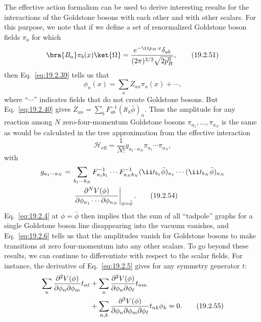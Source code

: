 The effective action formalism can be used to derive interesting results for
the interactions of the Goldstone bosons with each other and with other
scalars. For this purpose, we note that if we define a set of renormalized
Goldstone boson fields $\pi_a$ for which
\begin{equation}
 \bra{B_a}\pi_b(x)\ket{\Omega}
 =\frac{e^{-\ii p_B\cdot x}\delta_{ab}}
 {(2\pi)^{3/2}\sqrt{2p_B^0}},
 \tag{19.2.51}\label{eq:19.2.51}
\end{equation}
then Eq.~\eqref{eq:19.2.39} tells us that
\begin{equation}
 \phi_n(x)=\sum_a Z_{an}\pi_a(x)+\cdots,
 \tag{19.2.52}\label{eq:19.2.52}
\end{equation}
where ``$\cdots$'' indicates fields that do not create Goldstone bosons. But
Eq.~\eqref{eq:19.2.40} gives
$Z_{an}=\sum_bF^{-1}_{ab}(\ii t_b\bar\phi)_n$. Thus the amplitude for any
reaction among $N$ zero-four-momentum Goldstone bosons
$\pi_{a_1},\ldots,\pi_{a_N}$ is the same as would be calculated in the tree
approximation from the effective interaction
\begin{equation}
 \mathcal H_{\mathrm{eff}}
 =\frac{1}{N!}g_{a_1\cdots a_N}\pi_{a_1}\cdots\pi_{a_N},
 \tag{19.2.53}\label{eq:19.2.53}
\end{equation}
with
\begin{align}
 g_{a_1\cdots a_N}
={}&\sum_{b_1\cdots b_N}
 F^{-1}_{a_1b_1}\cdots F^{-1}_{a_Nb_N}
 (\ii t_{b_1}\bar\phi)_{n_1}\cdots(\ii t_{b_N}\bar\phi)_{n_N}
 \notag\\
 &{}\left.
 \frac{\partial^N V(\phi)}
 {\partial\phi_{n_1}\cdots\partial\phi_{n_N}}
 \right|_{\phi=\bar\phi}.
 \tag{19.2.54}\label{eq:19.2.54}
\end{align}
Eq.~\eqref{eq:19.2.4} at $\phi=\bar\phi$ then implies that the sum of all
``tadpole'' graphs for a single Goldstone boson line disappearing into the
vacuum vanishes, and Eq.~\eqref{eq:19.2.6} tells us that the amplitudes vanish
for Goldstone bosons to make transitions at zero four-momentum into any
other scalars. To go beyond these results, we can continue to differentiate
with respect to the scalar fields. For instance, the derivative of
Eq.~\eqref{eq:19.2.5} gives for any symmetry generator $t$:
\begin{align}
 \sum_n\frac{\partial^2V(\phi)}{\partial\phi_n\partial\phi_m}t_{n\ell}
 &+\sum_n\frac{\partial^2V(\phi)}{\partial\phi_n\partial\phi_\ell}t_{nm}
 \notag\\
 &+\sum_{n,k}
 \frac{\partial^3V(\phi)}
 {\partial\phi_n\partial\phi_m\partial\phi_\ell}
 t_{nk}\phi_k=0.
 \tag{19.2.55}\label{eq:19.2.55}
\end{align}

